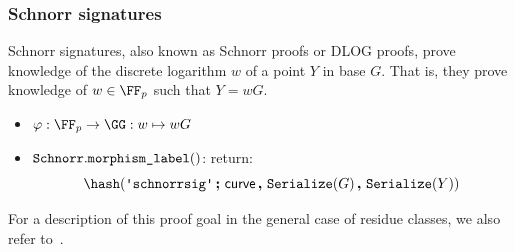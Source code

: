 \documentclass[11pt]{article}
\begin{document}
\subsubsection{Schnorr signatures}\label{sec:instantiations:schnorr}
Schnorr signatures, also known as Schnorr proofs or DLOG proofs, prove knowledge of the discrete logarithm $w$ of a point $Y$ in base $G$.
That is, they prove knowledge of $w\in\FF_p$ such that $Y=wG$.

\begin{itemize}
  \item $\varphi:\FF_p\to\GG:w\mapsto wG$
  \item $\texttt{Schnorr}.\texttt{morphism\_label}()$: return:
  \[
    \hash(\schnorrlabel \concatblock \curvectx \concat \serialize(G) \concat \serialize(\statement))
  \]
\end{itemize}

For a description of this proof goal in the general case of residue classes, we also refer to~\cite[1.4.1]{zkproof-reference}.

\end{document}
